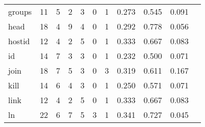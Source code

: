 \begin{longtable}{lp{1.10cm}p{1.10cm}p{1.10cm}p{1.10cm}p{1.10cm}p{1.10cm}p{1.10cm}p{1.10cm}p{1.10cm}p{1.10cm}}
groups    &                     11 &                                  5 &                                 2 &                                3 &                                 0 &                               1 &                          0.273 &                                 0.545 &                               0.091 \\
head      &                     18 &                                  4 &                                 9 &                                4 &                                 0 &                               1 &                          0.292 &                                 0.778 &                               0.056 \\
hostid    &                     12 &                                  4 &                                 2 &                                5 &                                 0 &                               1 &                          0.333 &                                 0.667 &                               0.083 \\
id        &                     14 &                                  7 &                                 3 &                                3 &                                 0 &                               1 &                          0.232 &                                 0.500 &                               0.071 \\
join      &                     18 &                                  7 &                                 5 &                                3 &                                 0 &                               3 &                          0.319 &                                 0.611 &                               0.167 \\
kill      &                     14 &                                  6 &                                 4 &                                3 &                                 0 &                               1 &                          0.250 &                                 0.571 &                               0.071 \\
link      &                     12 &                                  4 &                                 2 &                                5 &                                 0 &                               1 &                          0.333 &                                 0.667 &                               0.083 \\
ln        &                     22 &                                  6 &                                 7 &                                5 &                                 3 &                               1 &                          0.341 &                                 0.727 &                               0.045 \\

\end{longtable}

